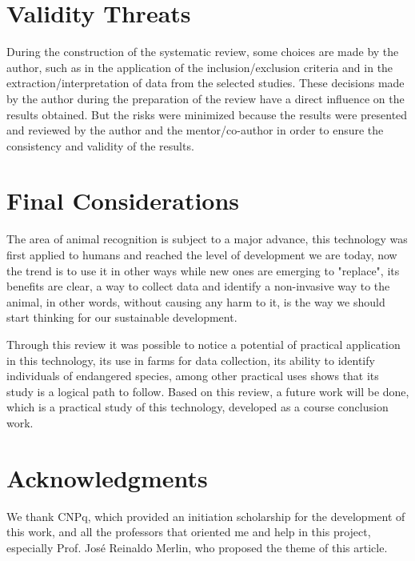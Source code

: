 \documentclass[alpha-refs,english]{RBCA_v3.0}
\begin{document}
\section{Validity Threats}
During the construction of the systematic review, some choices are made by the author, such as in the application of the inclusion/exclusion criteria and in the extraction/interpretation of data from the selected studies. These decisions made by the author during the preparation of the review have a direct influence on the results obtained. But the risks were minimized because the results were presented and reviewed by the author and the mentor/co-author in order to ensure the consistency and validity of the results.

\section{Final Considerations}
The area of animal recognition is subject to a major advance, this technology was first applied to humans and reached the level of development we are today, now the trend is to use it in other ways while new ones are emerging to "replace", its benefits are clear, a way to collect data and identify a non-invasive way to the animal, in other words, without causing any harm to it, is the way we should start thinking for our sustainable development.

Through this review it was possible to notice a potential of practical application in this technology, its use in farms for data collection, its ability to identify individuals of endangered species, among other practical uses shows that its study is a logical path to follow. Based on this review, a future work will be done, which is a practical study of this technology, developed as a course conclusion work.


\section*{Acknowledgments}

We thank CNPq, which provided an initiation scholarship for the development of this work, and all the professors that oriented me and help in this project, especially Prof. José Reinaldo Merlin, who proposed the theme of this article.

 
\end{document}
